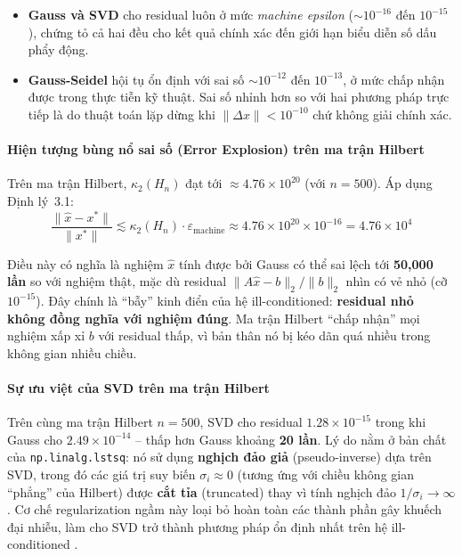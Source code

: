 \begin{itemize}
    \item \textbf{Gauss và SVD} cho residual luôn ở mức \textit{machine epsilon} ($\sim 10^{-16}$ đến $10^{-15}$), chứng tỏ cả hai đều cho kết quả chính xác đến giới hạn biểu diễn số dấu phẩy động.
    \item \textbf{Gauss-Seidel} hội tụ ổn định với sai số $\sim 10^{-12}$ đến $10^{-13}$, ở mức chấp nhận được trong thực tiễn kỹ thuật. Sai số nhỉnh hơn so với hai phương pháp trực tiếp là do thuật toán lặp dừng khi $\|\Delta x\| < 10^{-10}$ chứ không giải chính xác.
\end{itemize}

\paragraph{Hiện tượng bùng nổ sai số (Error Explosion) trên ma trận Hilbert}

Trên ma trận Hilbert, $\kappa_2(H_n)$ đạt tới $\approx 4.76 \times 10^{20}$ (với $n = 500$). Áp dụng Định lý~3.1:
\begin{equation}
    \frac{\|\hat{x} - x^*\|}{\|x^*\|} \lesssim \kappa_2(H_n) \cdot \varepsilon_{\text{machine}} \approx 4.76 \times 10^{20} \times 10^{-16} = 4.76 \times 10^{4}
\end{equation}

Điều này có nghĩa là nghiệm $\hat{x}$ tính được bởi Gauss có thể sai lệch tới \textbf{50,000 lần} so với nghiệm thật, mặc dù residual $\|A\hat{x} - b\|_2/\|b\|_2$ nhìn có vẻ nhỏ (cỡ $10^{-15}$). Đây chính là ``bẫy'' kinh điển của hệ ill-conditioned: \textbf{residual nhỏ không đồng nghĩa với nghiệm đúng}. Ma trận Hilbert ``chấp nhận'' mọi nghiệm xấp xỉ $b$ với residual thấp, vì bản thân nó bị kéo dãn quá nhiều trong không gian nhiều chiều.

\paragraph{Sự ưu việt của SVD trên ma trận Hilbert}

Trên cùng ma trận Hilbert $n = 500$, SVD cho residual $1.28 \times 10^{-15}$ trong khi Gauss cho $2.49 \times 10^{-14}$ -- thấp hơn Gauss khoảng \textbf{20 lần}. Lý do nằm ở bản chất của \texttt{np.linalg.lstsq}: nó sử dụng \textbf{nghịch đảo giả} (pseudo-inverse) dựa trên SVD, trong đó các giá trị suy biến $\sigma_i \approx 0$ (tương ứng với chiều không gian ``phẳng'' của Hilbert) được \textbf{cắt tỉa} (truncated) thay vì tính nghịch đảo $1/\sigma_i \to \infty$. Cơ chế regularization ngầm này loại bỏ hoàn toàn các thành phần gây khuếch đại nhiễu, làm cho SVD trở thành phương pháp ổn định nhất trên hệ ill-conditioned \cite{golub}.

